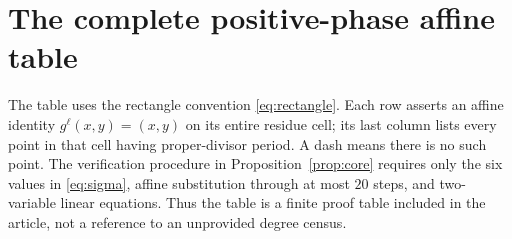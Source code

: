 \section{The complete positive-phase affine table}\label{app:affine}

The table uses the rectangle convention \eqref{eq:rectangle}.
Each row asserts an affine identity $g^\ell(x,y)=(x,y)$ on
its entire residue cell; its last column lists every point in
that cell having proper-divisor period. A dash means there is
no such point. The verification procedure in
Proposition~\ref{prop:core} requires only the six values in
\eqref{eq:sigma}, affine substitution through at most $20$ steps,
and two-variable linear equations. Thus the table is a finite
proof table included in the article, not a reference to an
unprovided degree census.

